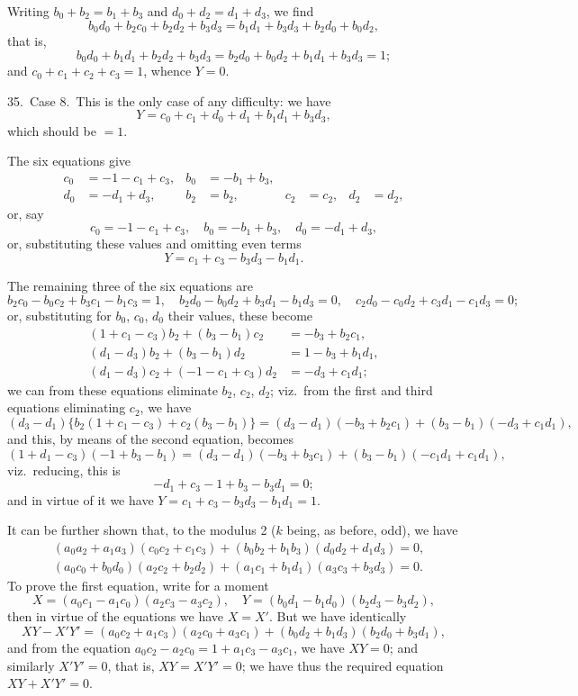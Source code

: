 \documentclass[11pt,a4paper]{book}
\begin{document}
Writing $b_0 + b_2 = b_1 + b_3$ and $d_0 + d_2 = d_1 + d_3$, we find
\[
b_0d_0 + b_2c_0 + b_2d_2 + b_3d_3 = b_1d_1 + b_3d_3 + b_2d_0 + b_0d_2,
\]
that is,
\[
b_0d_0 + b_1d_1 + b_2d_2 + b_3d_3 = b_2d_0 + b_0d_2 + b_1d_1 + b_3d_3 = 1;
\]
and $c_0 + c_1 + c_2 + c_3 = 1$, whence $Y = 0$.

\medskip

35.\ Case 8.\ This is the only case of any difficulty: we have
\[
Y = c_0 + c_1 + d_0 + d_1 + b_1d_1 + b_3d_3,
\]
which should be $= 1$.

The six equations give
\begin{align*}
c_0 &= -1 - c_1 + c_3, & b_0 &= -b_1 + b_3,\\
d_0 &= -d_1 + d_3, & b_2 &= b_2, & c_2 &= c_2, & d_2 &= d_2,
\end{align*}
or, say
\[
c_0 = -1 - c_1 + c_3, \quad b_0 = -b_1 + b_3, \quad d_0 = -d_1 + d_3,
\]
or, substituting these values and omitting even terms
\[
Y = c_1 + c_3 - b_3d_3 - b_1d_1.
\]

The remaining three of the six equations are
\[
b_2c_0 - b_0c_2 + b_3c_1 - b_1c_3 = 1, \quad b_2d_0 - b_0d_2 + b_3d_1 - b_1d_3 = 0, \quad c_2d_0 - c_0d_2 + c_3d_1 - c_1d_3 = 0;
\]
or, substituting for $b_0$, $c_0$, $d_0$ their values, these become
\begin{align*}
(1 + c_1 - c_3)b_2 + (b_3 - b_1)c_2 &= -b_3 + b_2c_1,\\
(d_1 - d_3)b_2 + (b_3 - b_1)d_2 &= 1 - b_3 + b_1d_1,\\
(d_1 - d_3)c_2 + (-1 - c_1 + c_3)d_2 &= -d_3 + c_1d_1;
\end{align*}
we can from these equations eliminate $b_2$, $c_2$, $d_2$; viz.\ from the first and third equations eliminating $c_2$, we have
\[
(d_3 - d_1)\{b_2(1 + c_1 - c_3) + c_2(b_3 - b_1)\} = (d_3 - d_1)(-b_3 + b_2c_1) + (b_3 - b_1)(-d_3 + c_1d_1),
\]
and this, by means of the second equation, becomes
\[
(1 + d_1 - c_3)(-1 + b_3 - b_1) = (d_3 - d_1)(-b_3 + b_3c_1) + (b_3 - b_1)(-c_1d_1 + c_1d_1),
\]
viz.\ reducing, this is
\[
-d_1 + c_3 - 1 + b_3 - b_3d_1 = 0;
\]
and in virtue of it we have $Y = c_1 + c_3 - b_3d_3 - b_1d_1 = 1$.

It can be further shown that, to the modulus 2 ($k$ being, as before, odd), we have
\begin{align*}
&(a_0a_2 + a_1a_3)(c_0c_2 + c_1c_3) + (b_0b_2 + b_1b_3)(d_0d_2 + d_1d_3) = 0,\\
&(a_0c_0 + b_0d_0)(a_2c_2 + b_2d_2) + (a_1c_1 + b_1d_1)(a_3c_3 + b_3d_3) = 0.
\end{align*}
To prove the first equation, write for a moment
\[
X = (a_0c_1 - a_1c_0)(a_2c_3 - a_3c_2), \quad Y = (b_0d_1 - b_1d_0)(b_2d_3 - b_3d_2),
\]
then in virtue of the equations we have $X = X'$. But we have identically
\[
XY - X'Y' = (a_0c_2 + a_1c_3)(a_2c_0 + a_3c_1) + (b_0d_2 + b_1d_3)(b_2d_0 + b_3d_1),
\]
and from the equation $a_0c_2 - a_2c_0 = 1 + a_1c_3 - a_3c_1$, we have $XY = 0$; and similarly $X'Y' = 0$, that is, $XY = X'Y' = 0$; we have thus the required equation $XY + X'Y' = 0$.
\end{document}
